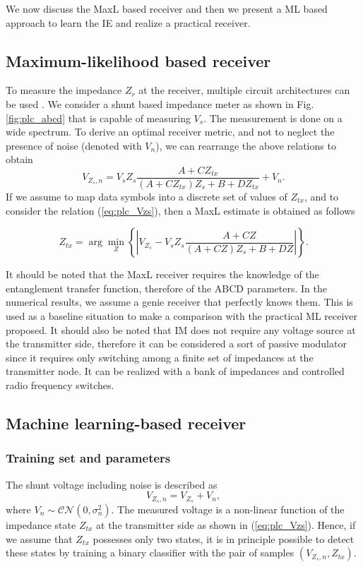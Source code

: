 We now discuss the MaxL based receiver and then we present a ML based approach to learn the IE and realize a practical receiver.

\subsection{Maximum-likelihood based receiver}
To measure the impedance $Z_{r}$ at the receiver, multiple circuit architectures can be used \cite{Passerini2017, Hallak2018}. We consider a shunt based impedance meter as shown in Fig. \ref{fig:plc_abcd} that is capable of measuring $V_s$. The measurement is done on a wide spectrum. To derive an optimal receiver metric, and not to neglect the presence of noise (denoted with $V_n$), we can rearrange the above relations to obtain
\begin{equation}
V_{Z_s,n}= V_s Z_s\frac{A + CZ_{tx}}{(A+CZ_{tx})Z_s +B+DZ_{tx}} + V_n.
\label{eq:plc_Vzs}
\end{equation}
If we assume to map data symbols into a discrete set of values of $Z_{tx}$, and to consider the relation (\ref{eq:plc_Vzs}), then a MaxL estimate is obtained as follows

\begin{equation}
Z_{tx}=\arg\min_{Z}\left\{\left|V_{Z_s} - V_sZ_s\frac{A+CZ}{(A+CZ)Z_s + B + DZ}\right|\right\}.
\label{eq:plc_zgarg}
\end{equation}

It should be noted that the MaxL receiver requires the knowledge of the entanglement transfer function, therefore of the ABCD parameters. In the numerical results, we assume a genie receiver that perfectly knows them. This is used as a baseline situation to make a comparison with the practical ML receiver proposed. It should also be noted that IM does not require any voltage source at the transmitter side, therefore it can be considered a sort of passive modulator since it requires only switching among a finite set of impedances at the transmitter node. It can be realized with a bank of impedances and controlled radio frequency switches. 

\subsection{Machine learning-based receiver}
\subsubsection{Training set and parameters}
The shunt voltage including noise is described as
\begin{equation}
V_{Z_s,n} = V_{Z_s}+V_n,
\end{equation}
where $V_n \sim \mathcal{CN}(0, \sigma_n^2)$. The measured voltage is a non-linear function of the impedance state $Z_{tx}$ at the transmitter side as shown in (\ref{eq:plc_Vzs}). Hence, if we assume that $Z_{tx}$ possesses only two states, it is in principle possible to detect these states by training a binary classifier with the pair of samples $(V_{Z_s,n},Z_{tx})$.

